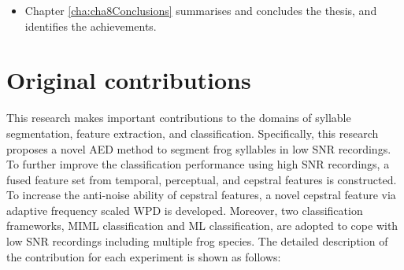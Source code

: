 \begin{itemize}


\item  Chapter \ref{cha:cha8Conclusions} summarises and concludes the thesis, and identifies the achievements.

\end{itemize}

\section{Original contributions}
This research makes important contributions to the domains of syllable segmentation, feature extraction, and classification. Specifically, this research proposes a novel AED method to segment frog syllables in low SNR recordings. To further improve the classification performance using high SNR recordings, a fused feature set from temporal, perceptual, and cepstral features is constructed. To increase the anti-noise ability of cepstral features, a novel cepstral feature via adaptive frequency scaled WPD is developed. Moreover, two classification frameworks, MIML classification and ML classification, are adopted to cope with low SNR recordings including multiple frog species. The detailed description of the contribution for each experiment is shown as follows:

